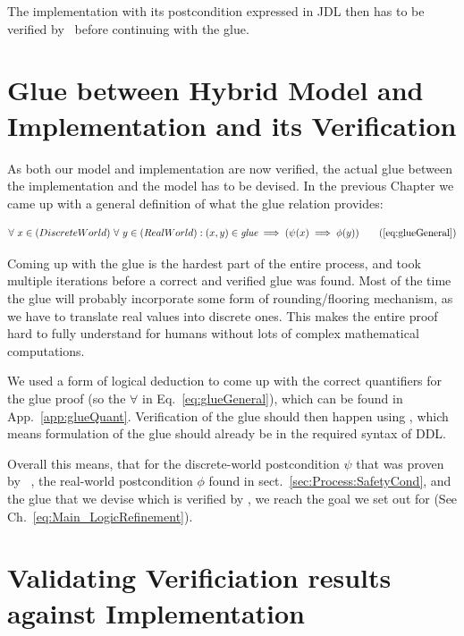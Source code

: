 The implementation with its postcondition expressed in JDL then has to be verified by \key~before continuing with the glue. 

\section{Glue between Hybrid Model and Implementation and its Verification}
\label{sec:Process:Glue}

As both our model and implementation are now verified, the actual glue between the implementation and the model has to be devised. In the previous Chapter we came up with a general definition of what the glue relation provides:

\begin{equation}
	\centering
	\begin{split}
		\forall~x \in (Discrete World)~\forall~y \in (Real World):(x,y) \in \textit{glue} \implies (\psi(x) \implies \phi(y))
	\end{split}
	\tag{\ref{eq:glueGeneral}}
\end{equation}

Coming up with the glue is the hardest part of the entire process, and took multiple iterations before a correct and verified glue was found. Most of the time the glue will probably incorporate some form of rounding/flooring mechanism, as we have to translate real values into discrete ones. This makes the entire proof hard to fully understand for humans without lots of complex mathematical computations.

We used a form of logical deduction to come up with the correct quantifiers for the glue proof (so the \(\forall\) in Eq.~\ref{eq:glueGeneral}), which can be found in App.~\ref{app:glueQuant}. Verification of the glue should then happen using \keym, which means formulation of the glue should already be in the required syntax of DDL.

Overall this means, that for the discrete-world postcondition \(\psi\) that was proven by \key~, the real-world postcondition \(\phi\) found in sect.~\ref{sec:Process:SafetyCond}, and the glue that we devise which is verified by \keym, we reach the goal we set out for (See Ch.~\ref{eq:Main_LogicRefinement}).

\section{Validating Verificiation results against Implementation}
\label{sec:Process:Eval}

